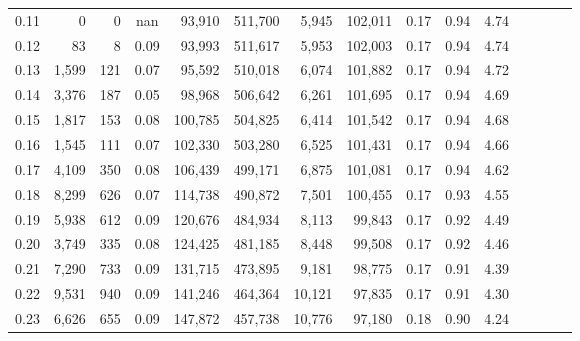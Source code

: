 \begin{tabular}{rrrcrrrrrrrrrrr}
0.11 &       0 &      0 &                                        nan &   93,910 &  511,700 &    5,945 &  102,011 &  0.17 &  0.94 &                         4.74 \\
0.12 &      83 &      8 &                                       0.09 &   93,993 &  511,617 &    5,953 &  102,003 &  0.17 &  0.94 &                         4.74 \\
0.13 &   1,599 &    121 &                                       0.07 &   95,592 &  510,018 &    6,074 &  101,882 &  0.17 &  0.94 &                         4.72 \\
0.14 &   3,376 &    187 &                                       0.05 &   98,968 &  506,642 &    6,261 &  101,695 &  0.17 &  0.94 &                         4.69 \\
0.15 &   1,817 &    153 &                                       0.08 &  100,785 &  504,825 &    6,414 &  101,542 &  0.17 &  0.94 &                         4.68 \\
0.16 &   1,545 &    111 &                                       0.07 &  102,330 &  503,280 &    6,525 &  101,431 &  0.17 &  0.94 &                         4.66 \\
0.17 &   4,109 &    350 &                                       0.08 &  106,439 &  499,171 &    6,875 &  101,081 &  0.17 &  0.94 &                         4.62 \\
0.18 &   8,299 &    626 &                                       0.07 &  114,738 &  490,872 &    7,501 &  100,455 &  0.17 &  0.93 &                         4.55 \\
0.19 &   5,938 &    612 &                                       0.09 &  120,676 &  484,934 &    8,113 &   99,843 &  0.17 &  0.92 &                         4.49 \\
0.20 &   3,749 &    335 &                                       0.08 &  124,425 &  481,185 &    8,448 &   99,508 &  0.17 &  0.92 &                         4.46 \\
0.21 &   7,290 &    733 &                                       0.09 &  131,715 &  473,895 &    9,181 &   98,775 &  0.17 &  0.91 &                         4.39 \\
0.22 &   9,531 &    940 &                                       0.09 &  141,246 &  464,364 &   10,121 &   97,835 &  0.17 &  0.91 &                         4.30 \\
0.23 &   6,626 &    655 &                                       0.09 &  147,872 &  457,738 &   10,776 &   97,180 &  0.18 &  0.90 &                         4.24 \\

\end{tabular}
